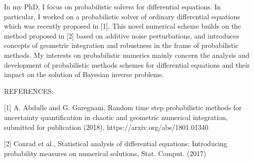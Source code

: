 \documentclass{report}
\begin{document}
	
	In my PhD, I focus on probabilistic solvers for differential equations. In particular, I worked on a probabilistic solver of ordinary differential equations which was recently proposed in [1].
	This novel numerical scheme builds on the method proposed in [2] based on additive noise perturbations, and introduces concepts of geometric integration and robustness in the frame of probabilistic methods.
	My interests on probabilistic numerics mainly concern the analysis and development of probabilistic methods schemes for differential equations and their impact on the solution of Bayesian inverse problems.
	
	REFERENCES:
	
	[1] A. Abdulle and G. Garegnani, Random time step probabilistic methods for uncertainty quantification in chaotic and geometric numerical integration, submitted for publication (2018), https://arxiv.org/abs/1801.01340
	
	[2] Conrad et al., Statistical analysis of differential equations: Introducing probability measures on numerical solutions, Stat. Comput. (2017)
	
\end{document}
